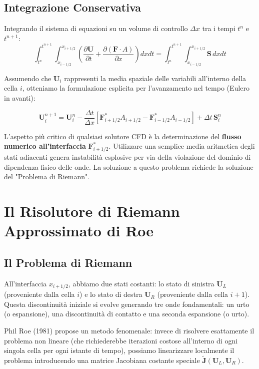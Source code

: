 \documentclass[11pt,a4paper]{article}
\begin{document}
\subsection{Integrazione Conservativa}
Integrando il sistema di equazioni su un volume di controllo $\Delta x$ tra i tempi $t^n$ e $t^{n+1}$:
\begin{equation}
\int_{t^n}^{t^{n+1}} \int_{x_{i-1/2}}^{x_{i+1/2}} \left( \frac{\partial \mathbf{U}}{\partial t} + \frac{\partial (\mathbf{F} \cdot A)}{\partial x} \right) dx dt = \int_{t^n}^{t^{n+1}} \int_{x_{i-1/2}}^{x_{i+1/2}} \mathbf{S} \, dx dt
\end{equation}

Assumendo che $\mathbf{U}_i$ rappresenti la media spaziale delle variabili all'interno della cella $i$, otteniamo la formulazione esplicita per l'avanzamento nel tempo (Eulero in avanti):

\begin{equation}
\mathbf{U}_i^{n+1} = \mathbf{U}_i^n - \frac{\Delta t}{\Delta x} \left[ \mathbf{F}^*_{i+1/2} A_{i+1/2} - \mathbf{F}^*_{i-1/2} A_{i-1/2} \right] + \Delta t \, \mathbf{S}_i^n
\end{equation}

L'aspetto più critico di qualsiasi solutore CFD è la determinazione del \textbf{flusso numerico all'interfaccia} $\mathbf{F}^*_{i+1/2}$. Utilizzare una semplice media aritmetica degli stati adiacenti genera instabilità esplosive per via della violazione del dominio di dipendenza fisico delle onde. La soluzione a questo problema richiede la soluzione del "Problema di Riemann".

\section{Il Risolutore di Riemann Approssimato di Roe}

\subsection{Il Problema di Riemann}
All'interfaccia $x_{i+1/2}$, abbiamo due stati costanti: lo stato di sinistra $\mathbf{U}_L$ (proveniente dalla cella $i$) e lo stato di destra $\mathbf{U}_R$ (proveniente dalla cella $i+1$). Questa discontinuità iniziale si evolve generando tre onde fondamentali: un urto (o espansione), una discontinuità di contatto e una seconda espansione (o urto). 

Phil Roe (1981) propose un metodo fenomenale: invece di risolvere esattamente il problema non lineare (che richiederebbe iterazioni costose all'interno di ogni singola cella per ogni istante di tempo), possiamo linearizzare localmente il problema introducendo una matrice Jacobiana costante speciale $\tilde{\mathbf{J}}(\mathbf{U}_L, \mathbf{U}_R)$.
\end{document}
